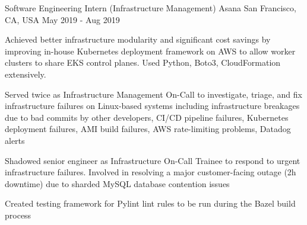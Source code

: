 \begin{cventries}
  \cventry
  {Software Engineering Intern (Infrastructure Management)} %
    {Asana} %
    {San Francisco, CA, USA} %
    {May 2019 - Aug 2019} %
    {
      \begin{cvitems} %
      \item {Achieved better infrastructure modularity and significant cost savings by improving in-house Kubernetes deployment framework on AWS to allow worker clusters to share EKS control planes. Used Python, Boto3, CloudFormation extensively.}
      \item {Served twice as Infrastructure Management On-Call to investigate, triage, and fix infrastructure failures on Linux-based systems including infrastructure breakages due to bad commits by other developers, CI/CD pipeline failures, Kubernetes deployment failures, AMI build failures, AWS rate-limiting problems, Datadog alerts}
       \item {Shadowed senior engineer as Infrastructure On-Call Trainee to respond to urgent infrastructure failures. Involved in resolving a major customer-facing outage (2h downtime) due to sharded MySQL database contention issues}
      \item {Created testing framework for Pylint lint rules to be run during the Bazel build process}
      \end{cvitems}
    }


\end{cventries}
